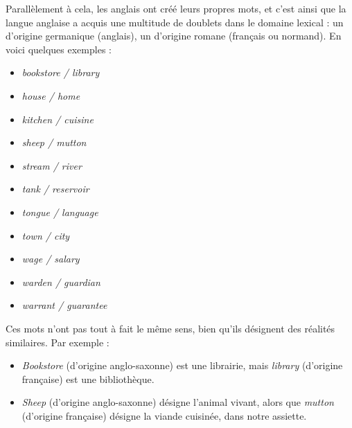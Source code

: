 Parallèlement à cela, les anglais ont créé leurs propres mots, et c’est ainsi que la langue anglaise a acquis une multitude de doublets dans le domaine lexical : un d’origine germanique (anglais), un d’origine romane (français ou normand). En voici quelques exemples :
\begin{itemize}
\item \textit{bookstore / library}
\item \textit{house / home}
\item \textit{kitchen / cuisine}
\item \textit{sheep / mutton}
\item \textit{stream / river}
\item \textit{tank / reservoir}
\item \textit{tongue / language}
\item \textit{town / city}
\item \textit{wage / salary}
\item \textit{warden / guardian}
\end{itemize}
\begin{itemize}
\item \textit{warrant / guarantee}
\end{itemize}
Ces mots n’ont pas tout à fait le même sens, bien qu’ils désignent des réalités similaires. Par exemple :
\begin{itemize}
\item \textit{Bookstore} (d’origine anglo-saxonne) est une librairie, mais \textit{library} (d’origine française) est une bibliothèque.
\item \textit{Sheep} (d’origine anglo-saxonne) désigne l’animal vivant, alors que \textit{mutton} (d’origine française) désigne la viande cuisinée, dans notre assiette.
\end{itemize}

